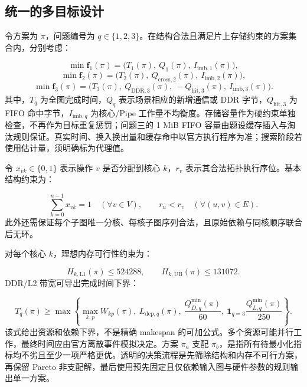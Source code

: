 \documentclass[UTF8,a4paper,zihao=-4]{ctexart}
\numberwithin{equation}{section}
\numberwithin{figure}{section}
\numberwithin{table}{section}
\begin{document}
\subsection{统一的多目标设计}
令方案为 $\pi$，问题编号为 $q\in\{1,2,3\}$。在结构合法且满足片上存储约束的方案集合内，分别考虑：

\begin{equation*}
\min \mathbf f_1(\pi)=
\bigl(T_1(\pi),\ Q_1(\pi),\ I_{\mathrm{imb},1}(\pi)\bigr),
\end{equation*}
\begin{equation*}
\min \mathbf f_2(\pi)=
\bigl(T_2(\pi),\ Q_{\mathrm{cross},2}(\pi),\ I_{\mathrm{imb},2}(\pi)\bigr),
\end{equation*}
\begin{equation*}
\min \mathbf f_3(\pi)=
\bigl(T_3(\pi),\ Q_{\mathrm{DDR},3}(\pi),\ -Q_{\mathrm{hit},3}(\pi),\ I_{\mathrm{imb},3}(\pi)\bigr).
\end{equation*}
其中，$T_q$ 为全图完成时间，$Q_q$ 表示场景相应的新增通信或 DDR 字节，$Q_{\mathrm{hit},3}$ 为 FIFO 命中字节，$I_{\mathrm{imb},q}$ 为核心/Pipe 工作量不均衡度。存储容量作为硬约束单独检查，不再作为目标重复惩罚；问题三的 1 MiB FIFO 容量由题设缓存插入与淘汰规则保证。真实时间、换入换出量和缓存命中以官方执行程序为准；搜索阶段若使用估计量，须明确标为代理值。

令 $x_{vk}\in\{0,1\}$ 表示操作 $v$ 是否分配到核心 $k$，$r_v$ 表示其合法拓扑执行序位。基本结构约束为：

\begin{equation*}
\sum_{k=0}^{n-1}x_{vk}=1\quad(\forall v\in V),\qquad
r_u<r_v\quad(\forall (u,v)\in E).
\end{equation*}
此外还需保证每个子图唯一分核、每核子图序列合法，且原始依赖与同核顺序联合后无环。

对每个核心 $k$，理想内存可行性约束为：

\begin{equation*}
H_{k,\mathrm{L1}}(\pi)\le 524288,\qquad
H_{k,\mathrm{UB}}(\pi)\le 131072.
\end{equation*}
DDR/L2 带宽可导出完成时间下界：

\begin{equation*}
T_q(\pi)\ge
\max\left\{
\max_{k,p}W_{kp}(\pi),\
L_{\mathrm{dep},q}(\pi),\
\frac{Q_{D,q}^{\min}(\pi)}{60},\
\mathbf 1_{q=3}\frac{Q_{L,q}^{\min}(\pi)}{250}
\right\}.
\end{equation*}
该式给出资源和依赖下界，不是精确 makespan 的可加公式。多个资源可能并行工作，最终时间应由官方离散事件模拟决定。方案 $\pi_a$ 支配 $\pi_b$，是指所有待最小化指标均不劣且至少一项严格更优。透明的决策流程是先筛除结构和内存不可行方案，再保留 Pareto 非支配解，最后使用预先固定且仅依赖输入图与硬件参数的规则输出单一方案。
\end{document}

